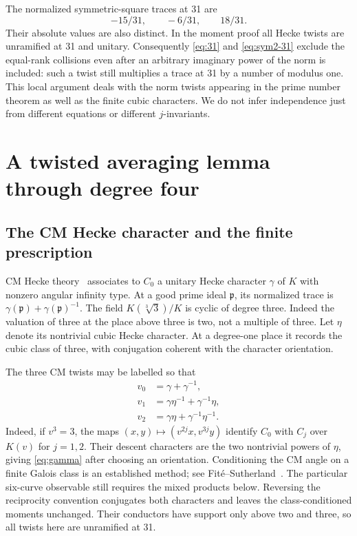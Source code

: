 \documentclass[11pt]{article}
\theoremstyle{definition}\newtheorem{definition}[theorem]{Definition}
\begin{document}
The normalized symmetric-square traces at 31 are
\begin{equation}\label{eq:sym2-31}
 -15/31,\qquad-6/31,\qquad18/31.
\end{equation}
Their absolute values are also distinct. In the moment
proof all Hecke twists are unramified at 31 and unitary.
Consequently \eqref{eq:31} and \eqref{eq:sym2-31}
exclude the equal-rank collisions even after an arbitrary
imaginary power of the norm is included: such a twist
still multiplies a trace at 31 by a number of modulus one.
This local argument deals with the norm twists appearing
in the prime number theorem as well as the finite cubic
characters. We do not infer independence just from
different equations or different $j$-invariants.

\section{A twisted averaging lemma through degree four}\label{sec:analytic}
\subsection{The CM Hecke character and the finite prescription}
CM Hecke theory~\cite[Theorem 3.6 in arXiv v1]{chenshen} associates to
$C_0$ a unitary Hecke character $\gamma$ of $K$ with
nonzero angular infinity type. At a good prime ideal
$\mathfrak p$, its normalized trace is
$\gamma(\mathfrak p)+\gamma(\mathfrak p)^{-1}$.
The field $K(\sqrt[3]{3})/K$ is cyclic of degree three.
Indeed the valuation of three at the place above three
is two, not a multiple of three.
Let $\eta$ denote its nontrivial cubic Hecke character.
At a degree-one place it records the cubic class of
three, with conjugation coherent with the character
orientation.

The three CM twists may be labelled so that
\begin{equation}\label{eq:gamma}
 \begin{split}
 v_0&=\gamma+\gamma^{-1},\\
 v_1&=\gamma\eta^{-1}+\gamma^{-1}\eta,\\
 v_2&=\gamma\eta+\gamma^{-1}\eta^{-1}.
 \end{split}
\end{equation}
Indeed, if $v^3=3$, the maps
$(x,y)\mapsto(v^{2j}x,v^{3j}y)$ identify $C_0$ with $C_j$
over $K(v)$ for $j=1,2$. Their descent characters are the two
nontrivial powers of $\eta$, giving \eqref{eq:gamma} after choosing
an orientation. Conditioning the CM angle on a finite Galois class
is an established method; see Fité--Sutherland~\cite[Propositions
3.6 and 3.10]{fitesutherland}. The particular six-curve observable
still requires the mixed products below.
Reversing the reciprocity convention conjugates both
characters and leaves the class-conditioned moments
unchanged. Their conductors have support only above
two and three, so all twists here are unramified at 31.
\end{document}
